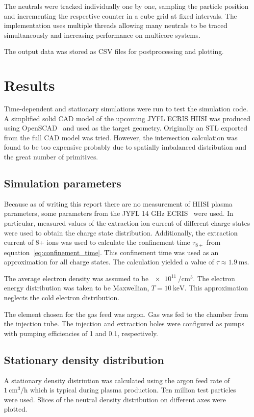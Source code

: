 \documentclass[a4paper,twoside,12pt]{article}
\begin{document}
The neutrals were tracked individually one by one, sampling the particle position and incrementing the respective counter in a cube grid at fixed intervals. The implementation uses multiple threads allowing many neutrals to be traced simultaneously and increasing performance on multicore systems.

The output data was stored as CSV files for postprocessing and plotting.

\section{Results}
Time-dependent and stationary simulations were run to test the simulation code. A simplified solid CAD model of the upcoming JYFL ECRIS HIISI was produced using OpenSCAD~\cite{openscad} and used as the target geometry. Originally an STL exported from the full CAD model was tried. However, the intersection calculation was found to be too expensive probably due to spatially imbalanced distribution and the great number of primitives.

\subsection{Simulation parameters}
Because as of writing this report there are no measurement of HIISI plasma parameters, some parameters from the JYFL 14 GHz ECRIS~\cite{jyfl:ecris14} were used. In particular, measured values of the extraction ion current of different charge states were used to obtain the charge state distribution. Additionally, the extraction current of 8+ ions was used to calculate the confinement time $\tau_{8+}$ from equation~\eqref{eq:confinement_time}. This confinement time was used as an approximation for all charge states. The calculation yielded a value of $\tau \approx \SI{1.9}{\milli\second}$.

The average electron density was assumed to be $\SI{e11}{\per\centi\meter\cubed}$. The electron energy distribution was taken to be Maxwellian, $T = \SI{10}{\kilo\electronvolt}$. This approximation neglects the cold electron distribution.

The element chosen for the gas feed was argon. Gas was fed to the chamber from the injection tube. The injection and extraction holes were configured as pumps with pumping efficiencies of 1 and 0.1, respectively.

\subsection{Stationary density distribution}
A stationary density distriution was calculated using the argon feed rate of $\SI{1}{\centi\metre\cubed\per\hour}$ which is typical during plasma production. Ten million test particles were used. Slices of the neutral density distribution on different axes were plotted.
\end{document}

